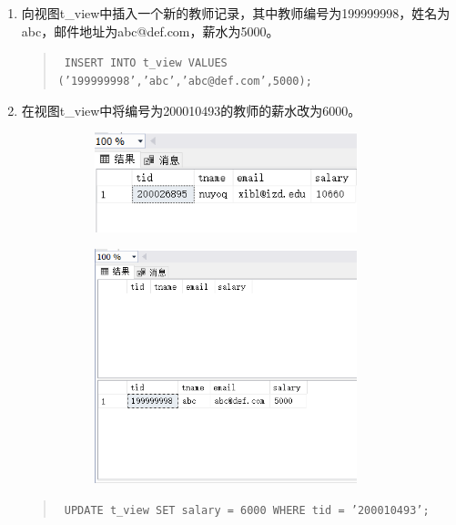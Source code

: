 \documentclass[a4paper,twoside]{article}
\begin{document}
\begin{spacing}{1.2}
\begin{enumerate}
\begin{figure}[htb]
\begin{subfigure}{0.4\textwidth}
  \end{subfigure}
\end{figure}

\item	向视图t\_view中插入一个新的教师记录，其中教师编号为199999998，姓名为abc，邮件地址为abc@def.com，薪水为5000。
\begin{quote}
  \texttt{
    INSERT INTO t\_view
VALUES ('199999998','abc','abc@def.com',5000);\\
  }
\end{quote}
\item	在视图t\_view中将编号为200010493的教师的薪水改为6000。
\begin{figure}[htb]
  \centering
  \begin{subfigure}{0.4\textwidth}
    \centering
    \includegraphics[width=0.9\textwidth]{11.png}
  \end{subfigure}
  \begin{subfigure}{0.4\textwidth}
    \centering
    \includegraphics[width=0.9\textwidth]{12.png}
  \end{subfigure}
\end{figure}
\begin{quote}
  \texttt{
UPDATE t\_view SET salary = 6000
WHERE tid = '200010493';\\
  }
\end{quote}


\end{enumerate}
\end{spacing}
\end{document}
